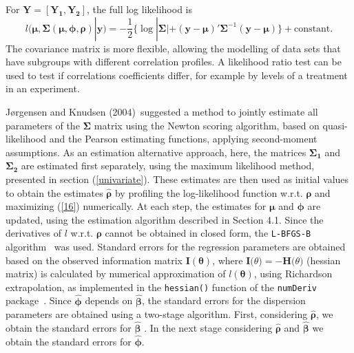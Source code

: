 \documentclass[useAMS,referee]{biom}
\begin{document}
For $\mathbf{Y} = \mathbf{[Y_1,Y_2]}$, the full log likelihood is
\begin{equation}\label{16}
l(\boldsymbol{\mu},\boldsymbol{\Sigma(\mu,\phi,\rho)}| \mathbf{y}) = -\frac{1}{2}\{\log |\boldsymbol{\Sigma}| +  (\mathbf{y}-\boldsymbol{\mu})'\boldsymbol{\Sigma}^{-1} (\mathbf{y}-\boldsymbol{\mu})\} + \mbox{constant}.
\end{equation}
The covariance matrix is more flexible, allowing the modelling of data sets that have subgroups with different correlation profiles. A likelihood ratio test can be used to test if correlations coefficients differ, for example by levels of a treatment in an experiment. 

J{\o}rgensen and Knudsen (2004)~\nocite{jorgensen2004parameter}suggested a method to jointly estimate all parameters of the $\boldsymbol{\Sigma}$ matrix using the Newton scoring algorithm, based on quasi-likelihood and the Pearson estimating functions, applying second-moment assumptions. As an estimation alternative approach, here, the matrices $\boldsymbol{\Sigma_1}$ and $\boldsymbol{\Sigma_2}$ are estimated first separately, using the maximum likelihood method, presented in section (\ref{univariate}). These estimates are then used as initial values to obtain the estimates $\boldsymbol{\hat\rho}$ by profiling the log-likelihood function w.r.t. $\boldsymbol{\rho}$ and maximizing (\ref{16}) numerically. At each step, the estimates for $\boldsymbol{\mu}$ and $\boldsymbol{\phi}$ are updated, using the estimation algorithm described in Section 4.1. Since the derivatives of $l$ w.r.t. $\boldsymbol{\rho}$ cannot be obtained in closed form, the  \texttt{L-BFGS-B} algorithm~\citep{zhu1997algorithm} was used. Standard errors for the regression parameters are obtained based on the observed information matrix $\mathbf{I}(\boldsymbol\theta)$, where $\textbf{I}\boldsymbol(\theta)= - \textbf{H}\boldsymbol(\theta)$ (hessian matrix) is calculated by numerical approximation of $l(\boldsymbol\theta)$, using Richardson extrapolation, as implemented in the \texttt{hessian()} function of the \texttt{numDeriv} package~\citep{gilbert2006numderiv}. Since $\hat{\boldsymbol{\phi}}$ depends on $\hat{\boldsymbol{\beta}}$, the standard errors for the dispersion parameters are obtained using a two-stage algorithm. First, considering $\boldsymbol{\hat\rho}$, we obtain the standard errors for $\boldsymbol{\hat\beta}$ . In the next stage considering $\boldsymbol{\hat\rho}$ and $\boldsymbol{\hat\beta}$ we obtain the standard errors for $\boldsymbol{\hat\phi}$.
\end{document}
